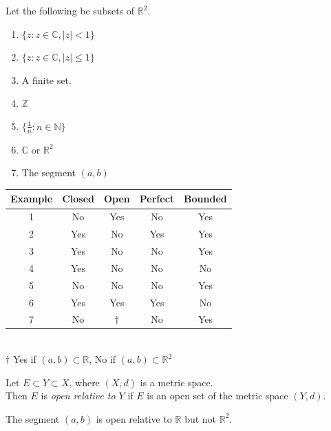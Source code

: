 \begin{eg} Let the following be subsets of $\mathbb{R}^{2}$.
    \begin{enumerate}
        \item $\{ z:z \in \mathbb{C}, |z| < 1 \}$
        \item $\{ z:z \in \mathbb{C}, |z| \le  1 \}$
        \item A finite set.
        \item $\mathbb{Z}$
        \item $\{ \frac{1}{n} : n \in \mathbb{N} \}$
        \item $\mathbb{C}$ or $\mathbb{R}^{2}$
        \item The segment $(a,b)$
    \end{enumerate}
    \begin{center}
        \begin{tabular}{|c|*{4}{c|}}
            \hline
             Example &\textbf{Closed} &\textbf{Open} &\textbf{Perfect} &\textbf{Bounded} \\
            \hline
            1 & No &Yes &No &Yes \\ \hline
            2 & Yes &No &Yes &Yes \\ \hline
            3 & Yes &No &No &Yes \\ \hline
            4 & Yes &No &No &No \\ \hline
            5 & No &No &No &Yes \\ \hline
            6 & Yes &Yes &Yes &No \\ \hline
            7 & No & $\dagger$ &No &Yes \\
            \hline
    \end{tabular}
    \\ $\dagger$ Yes if $(a,b) \subset \mathbb{R}$, No if $(a,b) \subset \mathbb{R}^{2}$
    \end{center}
\end{eg}

\begin{definition} Let $E \subset Y \subset X$, where $(X,d)$ is a metric space.
\\Then $E$ is \textit{open relative to $Y$} if $E$ is an open set of the metric space $(Y,d)$.
\end{definition}

\begin{remark}
    The segment $(a,b)$ is open relative to $\mathbb{R}$ but not $\mathbb{R}^{2}$.
\end{remark}

